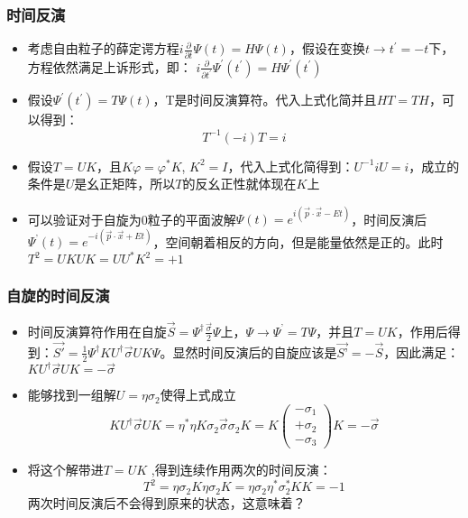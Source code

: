 \documentclass[CJK]{beamer}
\begin{document}
\begin{frame}
\frametitle{\bch 时间反演 \ech}
\bch
\begin{itemize}
\item 考虑自由粒子的薛定谔方程$i \frac{\partial}{\partial t} \varPsi(t)=H \varPsi(t)$，假设在变换$t \rightarrow t^{\prime}=-t$下，方程依然满足上诉形式，即：
$i \frac{\partial}{\partial t^{\prime}} \varPsi^{\prime}\left(t^{\prime}\right)=H \varPsi^{\prime}\left(t^{\prime}\right)$

\item 假设$\varPsi^{\prime}\left(t^{\prime}\right)=T \varPsi(t)$，T是时间反演算符。代入上式化简并且$HT=TH$，可以得到：
$$
T^{-1}(-i) T=i
$$

\item 假设$T=UK$，且$K\varphi=\varphi^*K$,  $K^2=I$，代入上式化简得到：$U^{-1}iU=i$，成立的条件是$U$是幺正矩阵，所以$T$的反幺正性就体现在$K$上

\item 可以验证对于自旋为0粒子的平面波解$\varPsi(t)=e^{i(\vec{p} \cdot \vec{x}-E t)}$，时间反演后 $\varPsi^{’}(t)=e^{-i(\vec{p} \cdot \vec{x}+E t)}$，空间朝着相反的方向，但是能量依然是正的。此时$T^{2}=UKUK=UU^*K^2=+1$



\end{itemize}
\ech
\end{frame}


\begin{frame}
\frametitle{\bch 自旋的时间反演 \ech}
\bch
\begin{itemize}
\item 时间反演算符作用在自旋$\vec{S}=\varPsi^{\dagger} \frac{\vec{\sigma}}{2} \varPsi$上，$\varPsi \rightarrow \varPsi^{’}=T\varPsi$，并且$T=UK$，作用后得到：$\vec{S'}=  \frac{1}{2} \varPsi^{\dagger} K U^{\dagger} \vec{\sigma} U K \varPsi$。显然时间反演后的自旋应该是$\vec{S’}=-\vec{S}$，因此满足：$K U^{\dagger} \vec{\sigma} U K =-\vec{\sigma} $

\item 能够找到一组解$U=\eta \sigma_2$使得上式成立
$$
K U^{\dagger} \vec{\sigma} U K=\eta^{*} \eta K \sigma_{2} \vec{\sigma} \sigma_{2} K=K\left(\begin{array}{c}{-\sigma_{1}} \\ {+\sigma_{2}} \\ {-\sigma_{3}}\end{array}\right) K=-\vec{\sigma}
$$

\item 将这个解带进$T=UK$ ,得到连续作用两次的时间反演：
$$
T^{2}=\eta \sigma_{2} K \eta \sigma_{2} K=\eta \sigma_{2} \eta^{*} \sigma_{2}^{*} K K=-1
$$
两次时间反演后不会得到原来的状态，这意味着？
\end{itemize}
\ech
\end{frame}
\end{document}
